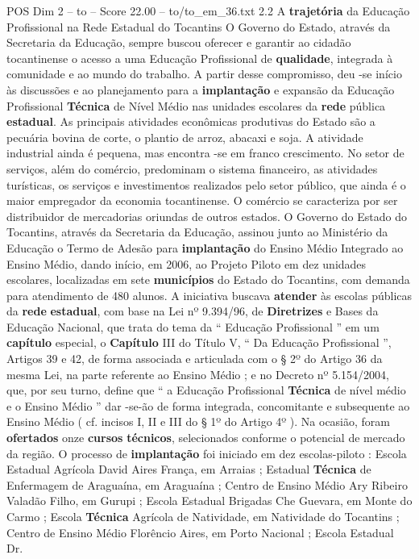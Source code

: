 \begin{textsample}{POS Dim 2 – to – Score 22.00 – to/to\_em\_36.txt}  \label{ex:f2_pos_138}
2.2 A \textbf{trajetória} da Educação Profissional na Rede Estadual do Tocantins O Governo do Estado, através da Secretaria da Educação, sempre buscou oferecer e garantir ao cidadão tocantinense o acesso a uma Educação Profissional de \textbf{qualidade}, integrada à comunidade e ao mundo do trabalho.
A partir desse compromisso, deu -se início às discussões e ao planejamento para a \textbf{implantação} e expansão da Educação Profissional \textbf{Técnica} de Nível Médio nas unidades escolares da \textbf{rede} pública \textbf{estadual}.
As principais atividades econômicas produtivas do Estado são a pecuária bovina de corte, o plantio de arroz, abacaxi e soja.
A atividade industrial ainda é pequena, mas encontra -se em franco crescimento.
No setor de serviços, além do comércio, predominam o sistema financeiro, as atividades turísticas, os serviços e investimentos realizados pelo setor público, que ainda é o maior empregador da economia tocantinense.
O comércio se caracteriza por ser distribuidor de mercadorias oriundas de outros estados.
O Governo do Estado do Tocantins, através da Secretaria da Educação, assinou junto ao Ministério da Educação o Termo de Adesão para \textbf{implantação} do Ensino Médio Integrado ao Ensino Médio, dando início, em 2006, ao Projeto Piloto em dez unidades escolares, localizadas em sete \textbf{municípios} do Estado do Tocantins, com demanda para atendimento de 480 alunos.
A iniciativa buscava \textbf{atender} às escolas públicas da \textbf{rede} \textbf{estadual}, com base na Lei nº 9.394/96, de \textbf{Diretrizes} e Bases da Educação Nacional, que trata do tema da “ Educação Profissional ” em um \textbf{capítulo} especial, o \textbf{Capítulo} III do Título V, “ Da Educação Profissional ”, Artigos 39 e 42, de forma associada e articulada com o § 2º do Artigo 36 da mesma Lei, na parte referente ao Ensino Médio ; e no Decreto nº 5.154/2004, que, por seu turno, define que “ a Educação Profissional \textbf{Técnica} de nível médio e o Ensino Médio ” dar -se-ão de forma integrada, concomitante e subsequente ao Ensino Médio ( cf. incisos I, II e III do § 1º do Artigo 4º ).
Na ocasião, foram \textbf{ofertados} onze \textbf{cursos} \textbf{técnicos}, selecionados conforme o potencial de mercado da região.
O processo de \textbf{implantação} foi iniciado em dez escolas-piloto : Escola Estadual Agrícola David Aires França, em Arraias ; Estadual \textbf{Técnica} de Enfermagem de Araguaína, em Araguaína ; Centro de Ensino Médio Ary Ribeiro Valadão Filho, em Gurupi ; Escola Estadual Brigadas Che Guevara, em Monte do Carmo ; Escola \textbf{Técnica} Agrícola de Natividade, em Natividade do Tocantins ; Centro de Ensino Médio Florêncio Aires, em Porto Nacional ; Escola Estadual Dr.

\end{textsample}
